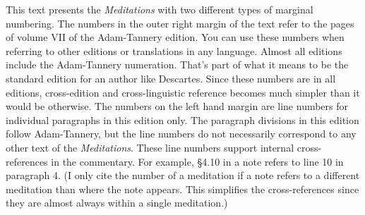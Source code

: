 This text presents the \textit{Meditations} with two different types of marginal numbering. The numbers in the outer right margin of the text refer to the pages of volume VII of the Adam-Tannery edition. You can use these numbers when referring to other editions or translations in any language. Almost all editions include the Adam-Tannery numeration. That's part of what it means to be the standard edition for an author like Descartes. Since these numbers are in all editions, cross-edition and cross-linguistic reference becomes much simpler than it would be otherwise. The numbers on the left hand margin are line numbers for individual paragraphs in this edition only. The paragraph divisions in this edition follow Adam-Tannery, but the line numbers do not necessarily correspond to any other text of the \textit{Meditations}. These line numbers support internal cross-references in the commentary. For example, §4.10 in a note refers to line 10 in paragraph 4. (I only cite the number of a meditation if a note refers to a different meditation than where the note appears. This simplifies the cross-references since they are almost always within a single meditation.)
